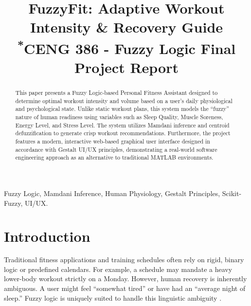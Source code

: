 \documentclass[conference]{IEEEtran}
\begin{document}
\title{FuzzyFit: Adaptive Workout Intensity \& Recovery Guide\\
{\footnotesize \textsuperscript{*}CENG 386 - Fuzzy Logic Final Project Report}
}

\author{
}

\maketitle

\begin{abstract}
This paper presents a Fuzzy Logic-based Personal Fitness Assistant designed to determine optimal workout intensity and volume based on a user's daily physiological and psychological state. Unlike static workout plans, this system models the ``fuzzy'' nature of human readiness using variables such as Sleep Quality, Muscle Soreness, Energy Level, and Stress Level. The system utilizes Mamdani inference and centroid defuzzification to generate crisp workout recommendations. Furthermore, the project features a modern, interactive web-based graphical user interface designed in accordance with Gestalt UI/UX principles, demonstrating a real-world software engineering approach as an alternative to traditional MATLAB environments.
\end{abstract}

\begin{IEEEkeywords}
Fuzzy Logic, Mamdani Inference, Human Physiology, Gestalt Principles, Scikit-Fuzzy, UI/UX.
\end{IEEEkeywords}

\section{Introduction}
Traditional fitness applications and training schedules often rely on rigid, binary logic or predefined calendars. For example, a schedule may mandate a heavy lower-body workout strictly on a Monday. However, human recovery is inherently ambiguous. A user might feel ``somewhat tired'' or have had an ``average night of sleep.'' Fuzzy logic is uniquely suited to handle this linguistic ambiguity \cite{zadeh1965fuzzy}. 
\end{document}

